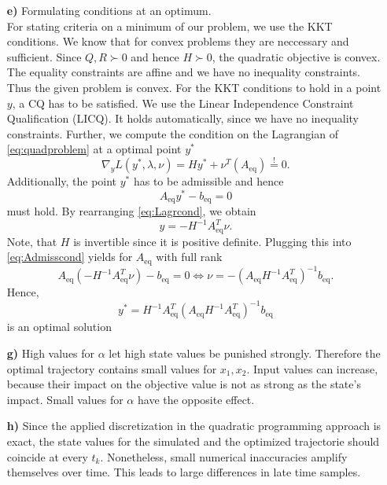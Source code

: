\documentclass[]{article}
\newcommand{\yopt}{y^*}
\newcommand{\todo}{{\color{red} TODO!}}
\newcommand{\ind}[2]{{#1}_{\mathrm{#2}}}
\newcommand{\trp}{^T}
\newcommand{\xone}{x_1}
\newcommand{\xtwo}{x_2}
\newcommand{\Aeq}{\ind{A}{eq}}
\newcommand{\beq}{\ind{b}{eq}}
\newcommand{\grad}{\nabla}
\newcommand{\inv}{^{-1}}
\begin{document}
\begin{enumerate}
\item[\bf e)] Formulating  conditions at an optimum.\\
For stating criteria on a minimum of our problem, we use the KKT conditions.
We know that for convex problems they are neccessary and sufficient. Since $ Q,R \succ 0$ and hence $ H \succ 0 $, the quadratic objective is convex. The equality constraints are affine and we have no inequality constraints. Thus the given problem is convex. For the KKT conditions to hold in a point $ y$, a CQ has to be satisfied. We use the Linear Independence Constraint Qualification (LICQ).
It holds automatically, since we have no inequality constraints. 
Further, we compute the condition on the Lagrangian of \eqref{eq:quadproblem} at a optimal point $ \yopt $
\begin{equation}
	\grad_y	L(\yopt,\lambda,\nu) = H\yopt + \nu \trp (\Aeq) \overset{!}{=} 0. \label{eq:Lagrcond}
\end{equation}
Additionally, the point $ \yopt $ has to be admissible and hence \begin{equation}
	\Aeq \yopt - \beq = 0 \label{eq:Admisscond}
\end{equation}
must hold.
By rearranging \eqref{eq:Lagrcond}, we obtain
\[ y = - H\inv\Aeq \trp \nu. \]
Note, that $ H $ is invertible since it is positive definite.
Plugging this into \eqref{eq:Admisscond} yields for $ \Aeq $ with full rank
\[  \Aeq (-H\inv \Aeq \trp \nu) -\beq = 0 \Longleftrightarrow \nu = -(\Aeq H\inv \Aeq\trp)\inv \beq.\]
Hence, \[ \yopt = H\inv \Aeq\trp (\Aeq H\inv \Aeq\trp)\inv \beq \] is an optimal solution\\




\item[\bf g)] High values for $ \alpha $ let high state values be punished strongly. Therefore the optimal trajectory contains small values for $ \xone,\xtwo $.  Input values can increase, because their impact on the objective value is not as strong as the state's impact. Small values for $ \alpha $ have the opposite effect. 

\item[\bf h)] Since the applied discretization in the quadratic programming approach is exact, the state values for the simulated and the optimized trajectorie should coincide at every $ t_k $. Nonetheless, small numerical inaccuracies amplify themselves over time. This leads to large differences in late time samples.




\end{enumerate}
\end{document}
